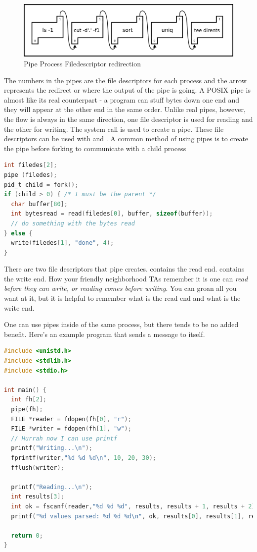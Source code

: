 \begin{figure}[H]
  \centering
  \includegraphics[width=.8\textwidth]{ipc/drawings/pipe_process.eps}
  \caption{Pipe Process Filedescriptor redirection}
\end{figure}

The numbers in the pipes are the file descriptors for each process and the arrow represents the redirect or where the output of the pipe is going.
A POSIX pipe is almost like its real counterpart - a program can stuff bytes down one end and they will appear at the other end in the same order.
Unlike real pipes, however, the flow is always in the same direction, one file descriptor is used for reading and the other for writing.
The  system call is used to create a pipe.
These file descriptors can be used with  and .
A common method of using pipes is to create the pipe before forking to communicate with a child process

\begin{lstlisting}[language=C]
int filedes[2];
pipe (filedes);
pid_t child = fork();
if (child > 0) { /* I must be the parent */
  char buffer[80];
  int bytesread = read(filedes[0], buffer, sizeof(buffer));
  // do something with the bytes read
} else {
  write(filedes[1], "done", 4);
}
\end{lstlisting}

There are two file descriptors that pipe creates.
 contains the read end.
 contains the write end.
How your friendly neighborhood TAs remember it is one can \textit{read before they can write, or reading comes before writing}.
You can groan all you want at it, but it is helpful to remember what is the read end and what is the write end.

One can use pipes inside of the same process, but there tends to be no added benefit.
Here's an example program that sends a message to itself.

\begin{lstlisting}[language=C]
#include <unistd.h>
#include <stdlib.h>
#include <stdio.h>

int main() {
  int fh[2];
  pipe(fh);
  FILE *reader = fdopen(fh[0], "r");
  FILE *writer = fdopen(fh[1], "w");
  // Hurrah now I can use printf
  printf("Writing...\n");
  fprintf(writer,"%d %d %d\n", 10, 20, 30);
  fflush(writer);

  printf("Reading...\n");
  int results[3];
  int ok = fscanf(reader,"%d %d %d", results, results + 1, results + 2);
  printf("%d values parsed: %d %d %d\n", ok, results[0], results[1], results[2]);

  return 0;
}
\end{lstlisting}

